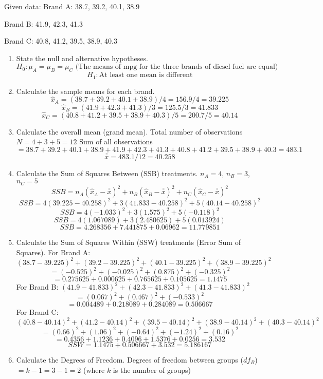 Given data:
Brand A: 38.7, 39.2, 40.1, 38.9

Brand B: 41.9, 42.3, 41.3

Brand C: 40.8, 41.2, 39.5, 38.9, 40.3

\begin{enumerate}
	\item State the null and alternative hypotheses.
\[
H_0: \mu_A = \mu_B = \mu_C \text{ (The means of mpg for the three brands of diesel fuel are equal)}
\]\[
H_1: \text{At least one mean is different}
\]	\item Calculate the sample means for each brand.
\[
\widehat{x}_A = (38.7 + 39.2 + 40.1 + 38.9) / 4 = 156.9 / 4 = 39.225
\]\[
\widehat{x}_B = (41.9 + 42.3 + 41.3) / 3 = 125.5 / 3 = 41.833
\]\[
\widehat{x}_C = (40.8 + 41.2 + 39.5 + 38.9 + 40.3) / 5 = 200.7 / 5 = 40.14
\]	\item Calculate the overall mean (grand mean).
Total number of observations $N = 4 + 3 + 5 = 12$
Sum of all observations $= 38.7 + 39.2 + 40.1 + 38.9 + 41.9 + 42.3 + 41.3 + 40.8 + 41.2 + 39.5 + 38.9 + 40.3 = 483.1$
\[
\overline{\overline{x}} = 483.1 / 12 = 40.258
\]	\item Calculate the Sum of Squares Between (SSB) treatments.
$n_A = 4$, $n_B = 3$, $n_C = 5$
\[
SSB = n_A(\widehat{x}_A - \overline{\overline{x}})^2 + n_B(\widehat{x}_B - \overline{\overline{x}})^2 + n_C(\widehat{x}_C - \overline{\overline{x}})^2
\]\[
SSB = 4(39.225 - 40.258)^2 + 3(41.833 - 40.258)^2 + 5(40.14 - 40.258)^2
\]\[
SSB = 4(-1.033)^2 + 3(1.575)^2 + 5(-0.118)^2
\]\[
SSB = 4(1.067089) + 3(2.480625) + 5(0.013924)
\]\[
SSB = 4.268356 + 7.441875 + 0.06962 = 11.779851
\]	\item Calculate the Sum of Squares Within (SSW) treatments (Error Sum of Squares).
For Brand A: $(38.7-39.225)^2 + (39.2-39.225)^2 + (40.1-39.225)^2 + (38.9-39.225)^2$
\[
= (-0.525)^2 + (-0.025)^2 + (0.875)^2 + (-0.325)^2
\]\[
= 0.275625 + 0.000625 + 0.765625 + 0.105625 = 1.1475
\]For Brand B: $(41.9-41.833)^2 + (42.3-41.833)^2 + (41.3-41.833)^2$
\[
= (0.067)^2 + (0.467)^2 + (-0.533)^2
\]\[
= 0.004489 + 0.218089 + 0.284089 = 0.506667
\]For Brand C: $(40.8-40.14)^2 + (41.2-40.14)^2 + (39.5-40.14)^2 + (38.9-40.14)^2 + (40.3-40.14)^2$
\[
= (0.66)^2 + (1.06)^2 + (-0.64)^2 + (-1.24)^2 + (0.16)^2
\]\[
= 0.4356 + 1.1236 + 0.4096 + 1.5376 + 0.0256 = 3.532
\]\[
SSW = 1.1475 + 0.506667 + 3.532 = 5.186167
\]	\item Calculate the Degrees of Freedom.
Degrees of freedom between groups ($df_B$) $= k - 1 = 3 - 1 = 2$ (where $k$ is the number of groups)

\end{enumerate}
